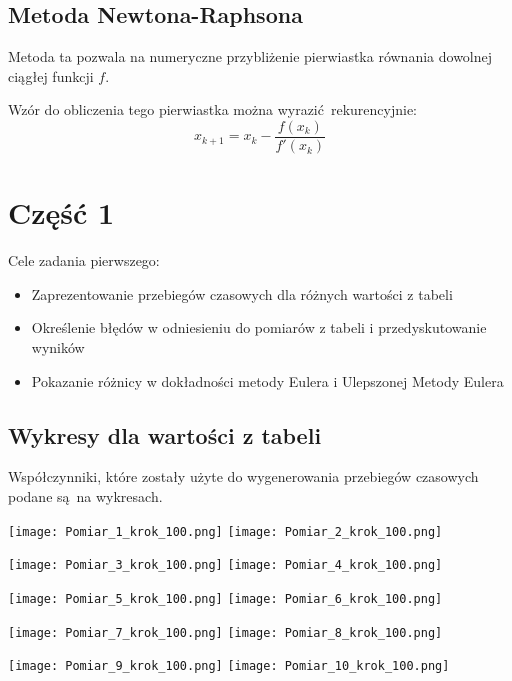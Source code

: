 \documentclass[varwidth,12pt,a4paper]{article}
\begin{document}


\subsection{Metoda Newtona-Raphsona}

Metoda ta pozwala na numeryczne przybliżenie pierwiastka równania dowolnej ciągłej funkcji $f$.

Wzór do obliczenia tego pierwiastka można wyrazić rekurencyjnie:
\begin{equation}
    x_{k+1} = x_k - \frac{f(x_k)}{f'(x_k)}
\end{equation}

\section{Część 1}

Cele zadania pierwszego:

\begin{itemize}
  \item Zaprezentowanie przebiegów czasowych dla różnych wartości z tabeli
  \item Określenie błędów w odniesieniu do pomiarów z tabeli i przedyskutowanie wyników
  \item Pokazanie różnicy w dokładności metody Eulera i Ulepszonej Metody Eulera
\end{itemize}

\subsection{Wykresy dla wartości z tabeli}

Współczynniki, które zostały użyte do wygenerowania przebiegów czasowych podane są na wykresach.

\texttt{[image: Pomiar\_1\_krok\_100.png]}\hspace{0.1\textwidth}%
\texttt{[image: Pomiar\_2\_krok\_100.png]}\par
\texttt{[image: Pomiar\_3\_krok\_100.png]}\hspace{0.1\textwidth}%
\texttt{[image: Pomiar\_4\_krok\_100.png]}\par
\texttt{[image: Pomiar\_5\_krok\_100.png]}\hspace{0.1\textwidth}%
\texttt{[image: Pomiar\_6\_krok\_100.png]}\par
\texttt{[image: Pomiar\_7\_krok\_100.png]}\hspace{0.1\textwidth}%
\texttt{[image: Pomiar\_8\_krok\_100.png]}\par
\texttt{[image: Pomiar\_9\_krok\_100.png]}\hspace{0.1\textwidth}%
\texttt{[image: Pomiar\_10\_krok\_100.png]}\par
\end{document}
